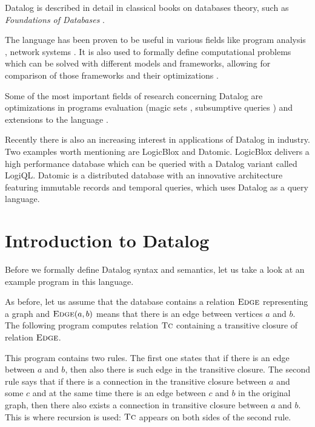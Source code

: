 Datalog is described in detail in classical books on databases theory, such as \emph{Foundations of Databases} \cite{fod}.

The language has been proven to be useful in various fields like program analysis \cite{pointanalysis}, network systems \cite{boomanalysis, dataloganalysis}. It is also used to formally define computational problems which can be solved with different models and frameworks, allowing for comparison of those frameworks and their optimizations \cite{ullman}. 

Some of the most important fields of research concerning Datalog are optimizations in programs evaluation (magic sets \cite{magicsets}, subsumptive queries \cite{subsumptivequeries}) and extensions to the language \cite{magicsetsexist, disjunctivedatalog, datalogrelaunched}.

Recently there is also an increasing interest in applications of Datalog in industry. Two examples worth mentioning are LogicBlox and Datomic. LogicBlox \cite{logicblox} delivers a high performance database which can be queried with a Datalog variant called LogiQL.  Datomic \cite{datomic} is a distributed database with an innovative architecture featuring immutable records and temporal queries, which uses Datalog as a query language.

\section{Introduction to Datalog}

Before we formally define Datalog syntax and semantics, let us take a look at an example program in this language.

As before, let us assume that the database contains a relation $\textsc{Edge}$ representing a graph and $\textsc{Edge}(a, b)$ means that there is an edge between vertices $a$ and $b$. The following program computes relation $\textsc{Tc}$ containing a transitive closure of relation $\textsc{Edge}$.


This program contains two rules. The first one states that if there is an edge between $a$ and $b$, then also there is such edge in the transitive closure. The second rule says that if there is a connection in the transitive closure between $a$ and some $c$ and at the same time there is an edge between $c$ and $b$ in the original graph, then there also exists a connection in transitive closure between $a$ and $b$. This is where recursion is used: $\textsc{Tc}$ appears on both sides of the second rule.

